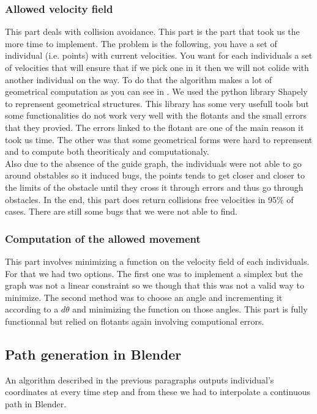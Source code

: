 \subsubsection{Allowed velocity field}

This part deals with collision avoidance. This part is the part that took us the more time to implement. The problem is the following, you have a set of individual (i.e. points) with current velocities. You want for each individuals a set of velocities that will ensure that if we pick one in it then we will not colide with another individual on the way. To do that the algorithm makes a lot of geometrical computation as you can see in \cite{vandenBerg2011}. We used the python library Shapely to reprensent geometrical structures. This library has some very usefull tools but some functionalities do not work very well with the flotants and the small errors that they provied. The errors linked to the flotant are one of the main reason it took us time. The other was that some geometrical forms were hard to reprensent and to compute both theoriticaly and computationaly.\\
Also due to the absence of the guide graph, the individuals were not able to go around obstables so it induced bugs, the points tends to get closer and closer to the limits of the obstacle until they cross it through errors and thus go through obstacles.
In the end, this part does return collisions free velocities in 95\% of cases. There are still some bugs that we were not able to find.

\subsubsection{Computation of the allowed movement}

This part involves minimizing a function on the velocity field of each individuals. For that we had two options. The first one was to implement a simplex but the graph was not a linear constraint so we though that this was not a valid way to minimize. The second method was to choose an angle and incrementing it according to a $d\theta$ and minimizing the function on those angles.
This part is fully functionnal but relied on flotants again involving computional errors.

\subsection{Path generation in Blender}

An algorithm described in the previous paragraphs outputs individual's coordinates at every time step and from these we had to interpolate a continuous path in Blender. 

